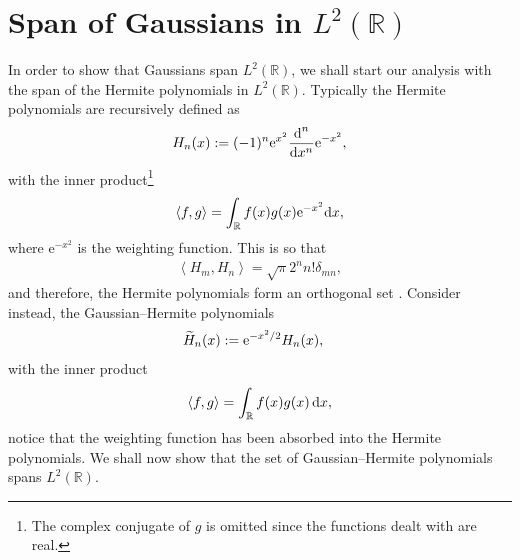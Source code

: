 \section{Span of Gaussians in $L^2(\mathbb{R})$}
In order to show that Gaussians span $L^2(\mathbb{R})$, we shall start our analysis with the span of the Hermite polynomials in $L^2(\mathbb{R})$. Typically the Hermite polynomials are recursively defined as \cite{conway, courant, teuwen}
\begin{align*}
H_n(x) := (-1)^n \textrm{e}^{x^2} \diff[n]{}{x} \textrm{e}^{-x^2},
\end{align*}
with the inner product\footnote{The complex conjugate of $g$ is omitted since the functions dealt with are real.}
\begin{align*}
\left< f, g \right> = \int_\mathbb{R} f(x) g(x) \textrm{e}^{-x^2} \df x,
\end{align*}
where $\textrm{e}^{-x^2}$ is the weighting function. This is so that 
\begin{align*}
\left< H_m, H_n \right> = \sqrt{\pi} 2^n n! \delta_{mn},
\end{align*}
and therefore, the Hermite polynomials form an orthogonal set \cite{courant, hochstrasser, kreyszig, szego, teuwen}. Consider instead, the Gaussian--Hermite polynomials
\begin{align*}
\Her{n}{x} &:= \textrm{e}^{-x^2/2} H_n(x),
\end{align*}
with the inner product
\begin{align*}
\left< f, g \right> = \int_\mathbb{R} f(x) g(x) \, \df x,
\end{align*}
notice that the weighting function has been absorbed into the Hermite polynomials. We shall now show that the set of Gaussian--Hermite polynomials spans $L^2(\mathbb{R})$. \\

